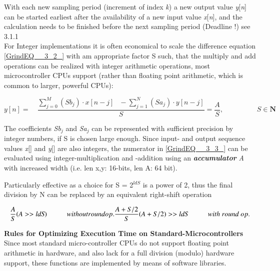 With each new sampling period (increment of index \textit{k}) a new output value \textit{y}[\textit{n}] can be started earliest after the availability of a new input value \textit{x}[\textit{n}], and the calculation needs to be finished before the next sampling period (Deadline !)  see 3.1.1\\

For Integer implementations it is often economical to scale the difference equation \eqref{GrindEQ__3_2_} with am appropriate factor S such, that the multiply and add operations can be realized with integer arithmetic operations, most microcontroller CPUs support (rather than floating point arithmetic, which is common to larger, powerful CPUs):

\begin{equation}
	y[n]=\quad \frac{\sum _{j=0}^{M}(Sb_{j} )\cdot x[n-j] \; \; \, -\sum _{j=1}^{N}(Sa_{j} )\cdot y[n-j] }{S} =\frac{A}{S}   ,  \hspace{2cm}  \textit{S} \in \textbf{N}
\label{EQ }
\end{equation}

The coefficients \textit{Sb${}_{j}$ }and \textit{Sa${}_{j}$} can be represented with sufficient precision by integer numbers, if S is chosen large enough. Since input- and output sequence values \textit{x}[] and \textit{y}[] are also integers, the numerator in \eqref{GrindEQ__3_3_} can be evaluated using integer-multiplication and -addition using an \textbf{\textit{accumulator}} \textit{A} with increased width (i.e. len x,y: 16-bits, len A: 64 bit). 

Particularly effective as a choice for S = 2\textit{${}^{ldS}$} is a power of 2, thus the final division by N can be replaced by an equivalent right-shift operation  

\begin{equation}
	\frac{A}{S}      (\textit{A} >> \textit{ldS})  \hspace{1cm}    without round op.\\
	\frac{A+S/2}{S}     (\textit{A} + S/2) >> \textit{ldS}  \hspace{1cm}  with\ round\ op.
\label{EQ }
\end{equation}

{\rot\bf Rules for Optimizing Execution Time on Standard-Microcontrollers}\\

Since most standard micro-controller CPUs do not support floating point arithmetic in hardware, and also lack for a full division (modulo) hardware support, these functions are implemented by means of software libraries.\\

